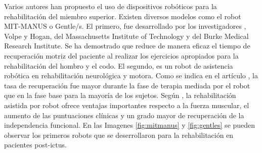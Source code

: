 Varios autores han propuesto el uso de dispositivos robóticos para la rehabilitación del miembro superior.
Existen diversos modelos como el robot MIT-MANUS o Gentle/s.
El primero, fue desarrollado por los investigadores \cite{perales3b}, Volpe y Hogan, del Massachusetts Institute of Technology y del Burke Medical Research Institute.
Se ha demostrado que reduce de manera eficaz el tiempo de recuperación motriz del paciente al realizar los ejercicios apropiados para la rehabilitación del hombro y el codo.
El segundo, es un robot de asistencia robótica en rehabilitación neurológica y motora.
Como se indica en el artículo \cite{perales3c}, la tasa de recuperación fue mayor durante la fase de terapia mediada por el robot que en la fase base para la mayoría de los sujetos.
Según \cite{perales3d}, la rehabilitación asistida por robot ofrece ventajas importantes respecto a la fuerza muscular, el aumento de las puntuaciones clínicas y un grado mayor de recuperación de la independencia funcional.
En las Imagenes \ref{fig:mitmanus} y \ref{fig:gentles} se pueden observar los primeros robots que se deserrollaron para la rehabilitación en pacientes post-ictus.

